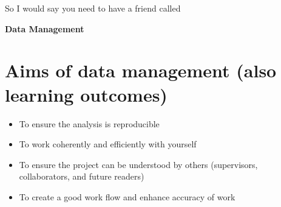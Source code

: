 \begin{frame}{\secname}

So I would say you need to have a friend called \\
\begin{center}
	{\huge \textbf{Data Management}}
\end{center}

\end{frame}

\section{Aims of data management (also learning outcomes)}
\begin{frame}{\secname}
\begin{itemize}
	\item<1|handout:1-> To ensure the analysis is reproducible
	\item<2|handout:2-> To work coherently and efficiently with yourself 
	\item<3|handout:3-> To ensure the project can be understood by others (supervisors, collaborators, and future readers)
	\item<4|handout:4> To create a good work flow and enhance accuracy of work 	
\end{itemize}
\end{frame}


